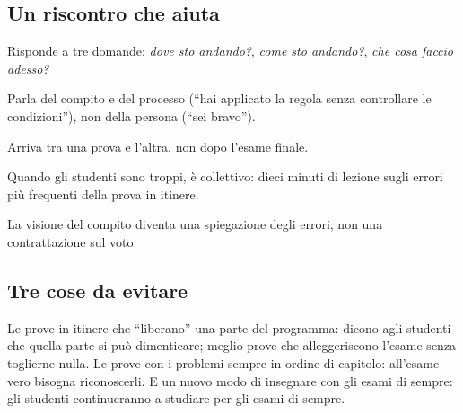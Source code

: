 \subsection*{Un riscontro che aiuta}

\begin{controlli}
  \item Risponde a tre domande: \emph{dove sto andando?}, \emph{come sto
        andando?}, \emph{che cosa faccio adesso?}
  \item Parla del compito e del processo (\enquote{hai applicato la
        regola senza controllare le condizioni}), non della persona
        (\enquote{sei bravo}).
  \item Arriva tra una prova e l'altra, non dopo l'esame finale.
  \item Quando gli studenti sono troppi, è collettivo: dieci minuti di
        lezione sugli errori più frequenti della prova in itinere.
  \item La visione del compito diventa una spiegazione degli errori,
        non una contrattazione sul voto.
\end{controlli}

\subsection*{Tre cose da evitare}

Le prove in itinere che \enquote{liberano} una parte del programma:
dicono agli studenti che quella parte si può dimenticare; meglio prove
che alleggeriscono l'esame senza toglierne nulla. Le prove con i
problemi sempre in ordine di capitolo: all'esame vero bisogna
riconoscerli. E un nuovo modo di insegnare con gli esami di sempre: gli
studenti continueranno a studiare per gli esami di sempre.

\normalsize
\finecapitolo
\flushbottom
